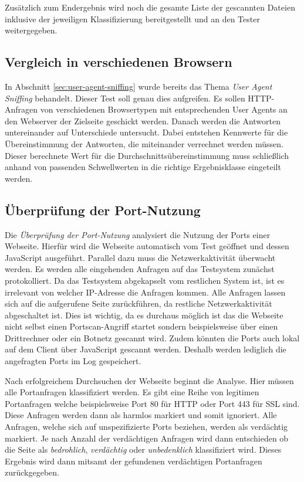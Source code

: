 Zusätzlich zum Endergebnis wird noch die gesamte Liste der gescannten Dateien inklusive der
jeweiligen Klassifizierung bereitgestellt und an den Tester weitergegeben.

\subsection{Vergleich in verschiedenen Browsern}

In Abschnitt \ref{sec:user-agent-sniffing} wurde bereits das Thema \textit{User Agent Sniffing}
behandelt.
Dieser Test soll genau dies aufgreifen.
Es sollen \acs{HTTP}-Anfragen von verschiedenen Browsertypen mit entsprechenden User Agents an den
Webserver der Zielseite geschickt werden.
Danach werden die Antworten untereinander auf Unterschiede untersucht. Dabei entstehen Kennwerte
für die Übereinstimmung der Antworten, die miteinander verrechnet werden müssen.
Dieser berechnete Wert für die Durchschnittsübereinstimmung muss schließlich anhand von passenden
Schwellwerten in die richtige Ergebnisklasse eingeteilt werden.

\subsection{Überprüfung der Port-Nutzung}
Die \textit{Überprüfung der Port-Nutzung} analysiert die Nutzung der Ports einer Webseite. Hierfür
wird die Webseite automatisch vom Test geöffnet und dessen JavaScript ausgeführt. Parallel dazu muss die
Netzwerkaktivität überwacht werden. Es werden alle eingehenden Anfragen auf das Testsystem zunächst
protokolliert. Da das Testsystem abgekapselt vom restlichen System ist, ist es irrelevant von
welcher IP-Adresse die Anfragen kommen. Alle Anfragen lassen sich auf die aufgerufene Seite
zurückführen, da restliche Netzwerkaktivität abgeschaltet ist. Dies ist wichtig, da es durchaus
möglich ist das die Webseite nicht selbst einen Portscan-Angriff startet sondern beispielsweise
über einen Drittrechner oder ein Botnetz gescannt wird. Zudem könnten die Ports auch lokal auf dem
Client über JavaScript gescannt werden. Deshalb werden lediglich die angefragten Ports im Log
gespeichert.

Nach erfolgreichem Durchsuchen der Webseite beginnt die Analyse. Hier müssen alle Portanfragen
klassifiziert werden. Es gibt eine Reihe von legitimen Portanfragen welche beispielsweise Port 80
für \acs{HTTP} oder Port 443 für \acs{SSL} sind. Diese Anfragen werden dann als harmlos markiert und
somit ignoriert. Alle Anfragen, welche sich auf unspezifizierte Ports beziehen, werden als
verdächtig markiert. Je nach Anzahl der verdächtigen Anfragen wird dann entschieden ob die Seite
als \textit{bedrohlich}, \textit{verdächtig} oder \textit{unbedenklich} klassifiziert wird. Dieses
Ergebnis wird dann mitsamt der gefundenen verdächtigen Portanfragen zurückgegeben.

